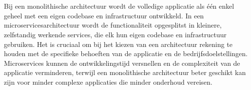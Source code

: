 
%
%
%
%
%

%



\chapter*{}
Bij een monolithische architectuur wordt de volledige applicatie als één enkel geheel met een eigen codebase en infrastructuur ontwikkeld. In een microservicesarchitectuur wordt de functionaliteit opgesplitst in kleinere, zelfstandig werkende services, die elk hun eigen codebase en infrastructuur gebruiken. Het is cruciaal om bij het kiezen van een architectuur rekening te houden met de specifieke behoeften van de applicatie en de bedrijfsdoelstellingen. Microservices kunnen de ontwikkelingstijd versnellen en de complexiteit van de applicatie verminderen, terwijl een monolithische architectuur beter geschikt kan zijn voor minder complexe applicaties die minder onderhoud vereisen.


